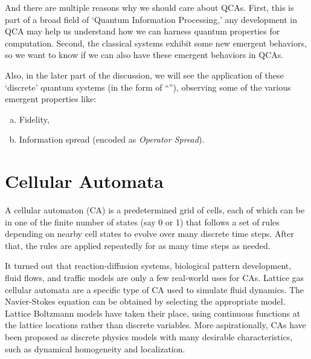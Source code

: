 \documentclass[11pt, oneside, listof=totoc]{scrbook}
\begin{document}
And there are multiple reasons why we should care about QCAs. First, this is part of a broad field of `Quantum Information Processing,' any development in QCA may help us understand how we can harness quantum properties for computation. Second, the classical systems exhibit some new emergent behaviors, so we want to know if we can also have these emergent behaviors in QCAs.


Also, in the later part of the discussion, we will see the application of these `discrete' quantum systems (in the form of ``''\cite{Fisher2023}), observing some of the various emergent properties like:
\begin{enumerate}[(a), noitemsep]
    \item Fidelity,
    \item Information spread (encoded as \emph{Operator Spread}).
\end{enumerate}

\section{Cellular Automata}

A cellular automaton (CA) is a predetermined grid of cells, each of which can be in one of the finite number of states (say 0 or 1) that follows a set of rules depending on nearby cell states to evolve over many discrete time steps.
After that, the rules are applied repeatedly for as many time steps as needed.

It turned out that reaction-diffusion systems, biological pattern development, fluid flows, and traffic models are only a few real-world uses for CAs. Lattice gas cellular automata are a specific type of CA used to simulate fluid dynamics. The Navier-Stokes equation can be obtained by selecting the appropriate model. Lattice Boltzmann models have taken their place, using continuous functions at the lattice locations rather than discrete variables. More aspirationally, CAs have been proposed as discrete physics models with many desirable characteristics, such as dynamical homogeneity and localization. %
\end{document}
